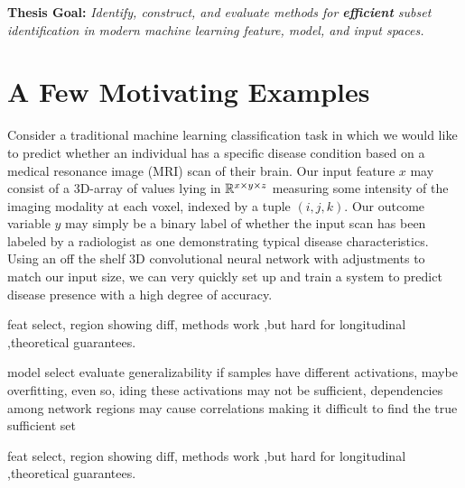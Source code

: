 \begin{mdframed}[style=MyFrame]
\textbf{ Thesis Goal: }
\em Identify, construct, and evaluate methods for \textbf{efficient} subset identification in modern machine learning feature, model, and input spaces.
\end{mdframed}

\section{A Few Motivating Examples}
Consider a traditional machine learning classification task in which we would like to predict whether an individual has a specific disease condition based on a medical resonance image (MRI) scan of their brain. Our input feature $x$ may consist of a 3D-array of values lying in $\mathbb{R}^{x\times y\times z}$ measuring some intensity of the imaging modality at each voxel, indexed by a tuple $(i,j,k)$.
Our outcome variable $y$ may simply be a binary label of whether the input scan has been labeled by a radiologist as one demonstrating typical disease characteristics.
Using an off the shelf 3D convolutional neural network with adjustments to match our input size, we can very quickly set up and train a system to predict disease presence with a high degree of accuracy.

\begin{example}
    feat select, region showing diff, methods work ,but hard for longitudinal ,theoretical guarantees.
\end{example}
\begin{example}
    model select
    evaluate generalizability
    if samples have different activations, maybe overfitting,
    even so, iding these activations may not be sufficient, dependencies among network regions may cause correlations making it difficult to find the true sufficient set
\end{example}
\begin{example}
    feat select, region showing diff, methods work ,but hard for longitudinal ,theoretical guarantees.
\end{example}


